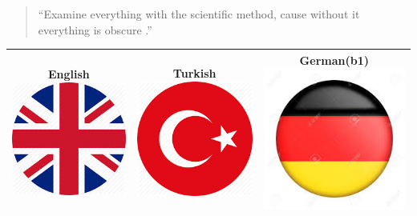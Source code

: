 

\begin{quote}
``Examine everything with the scientific method, cause without it everything is obscure .''
\end{quote}


\newline
{}\newline

\begin{tabular}{ |c|c|c| } \hline
 English{\includegraphics[scale=0.05]{eng.jpeg}} 
 &Turkish{\includegraphics[scale=0.05]{tr.png}}& German\hspace{2pt}(b1){\includegraphics[scale=0.05]{deu.jpeg}}\\ 
 \hline
\end{tabular}\newline


